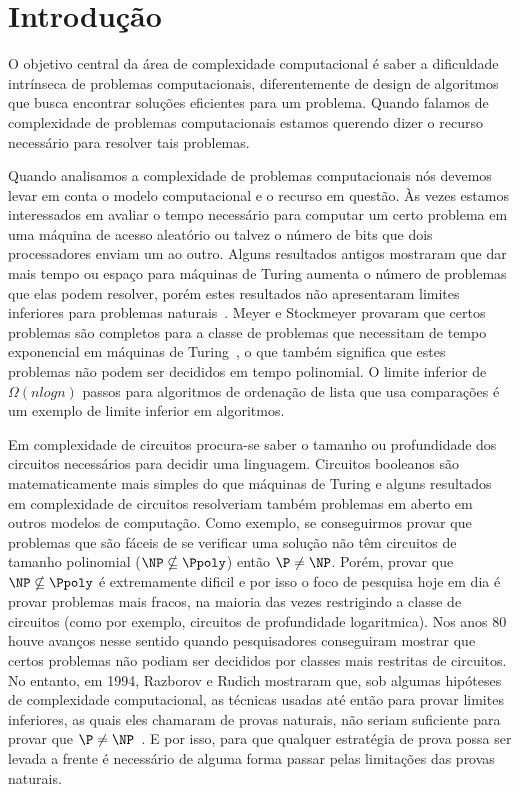 \chapter{Introdução}

O objetivo central da área de complexidade computacional é saber a dificuldade intrínseca de problemas computacionais, diferentemente de design de algoritmos que busca encontrar soluções eficientes para um problema. Quando falamos de complexidade de problemas computacionais estamos querendo dizer o recurso necessário para resolver tais problemas. 

Quando analisamos a complexidade de problemas computacionais nós devemos levar em conta o modelo computacional e o recurso em questão. Às vezes estamos interessados em avaliar o tempo necessário para computar um certo problema em uma máquina de acesso aleatório ou talvez o número de bits que dois processadores enviam um ao outro. Alguns resultados antigos mostraram que dar mais tempo ou espaço para máquinas de Turing aumenta o número de problemas que elas podem resolver, porém estes resultados não apresentaram limites inferiores para problemas naturais~\cite{arora2009computational}. Meyer e Stockmeyer provaram que certos problemas são completos para a classe de problemas que necessitam de tempo exponencial em máquinas de Turing~\cite{beyondNP}, o que também significa que estes problemas não podem ser decididos em tempo polinomial. O limite inferior de $\Omega(nlogn)$ passos para algoritmos de ordenação de lista que usa comparações é um exemplo de limite inferior em algoritmos.

Em complexidade de circuitos procura-se saber o tamanho ou profundidade dos circuitos necessários para decidir uma linguagem. Circuitos booleanos são matematicamente mais simples do que máquinas de Turing e alguns resultados em complexidade de circuitos resolveriam também problemas em aberto em outros modelos de computação. Como exemplo, se conseguirmos provar que problemas que são fáceis de se verificar uma solução não têm circuitos de tamanho polinomial ($\NP \nsubseteq \Ppoly$) então $\P \neq \NP$. Porém, provar que $\NP \nsubseteq \Ppoly$ é extremamente dificil e por isso o foco de pesquisa hoje em dia é provar problemas mais fracos, na maioria das vezes restrigindo a classe de circuitos (como por exemplo, circuitos de profundidade logaritmica). Nos anos 80 houve avanços nesse sentido quando pesquisadores conseguiram mostrar que certos problemas não podiam ser decididos por classes mais restritas de circuitos. No entanto, em 1994, Razborov e Rudich mostraram que, sob algumas hipóteses de complexidade computacional, as técnicas usadas até então para provar limites inferiores, as quais eles chamaram de provas naturais, não seriam suficiente para provar que $\P \neq \NP$~\cite{natural}. E por isso, para que qualquer estratégia de prova possa ser levada a frente é necessário de alguma forma passar pelas limitações das provas naturais.

